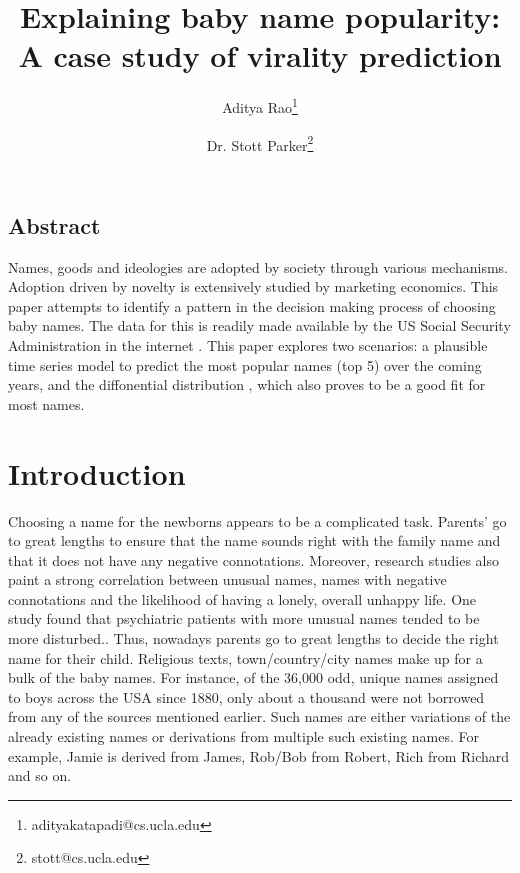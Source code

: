 \documentclass[letterpaper,10pt]{article}
\begin{document}
\date{}

\title{\Large \bf Explaining baby name popularity: A case study of virality prediction}

\author[1]{Aditya Rao\thanks{adityakatapadi@cs.ucla.edu}}
\author[2]{Dr. Stott Parker\thanks{stott@cs.ucla.edu}}
\maketitle

\thispagestyle{empty}


\subsection*{Abstract}
Names, goods and ideologies are adopted by society through various mechanisms. Adoption driven by novelty is extensively studied by marketing economics\cite{marketing paper}. This paper attempts to identify a pattern in the decision making process of choosing baby names. The data for this is readily made available by the US Social Security Administration in the internet \cite{voyagersite}. This paper explores two scenarios: a plausible time series model to predict the most popular names (top 5) over the coming years, and the diffonential distribution \cite{preston}, which also proves to be a good fit for most names.

\section{Introduction}
Choosing a name for the newborns appears to be a complicated task. Parents' go to great lengths to ensure that the name sounds right with the family name and that it does not have any negative connotations. Moreover, research studies also paint a strong correlation between unusual names, names with negative connotations and the likelihood of having a lonely, overall unhappy life. One study found that psychiatric patients with more unusual names tended to be more disturbed.\cite{http://www.bbc.com/news/magazine-26634477}. Thus, nowadays parents go to great lengths to decide the right name for their child.
Religious texts, town/country/city names make up for a bulk of the baby names. For instance, of the 36,000 odd, unique names assigned to boys across the USA since 1880, only about a thousand were not borrowed from any of the sources mentioned earlier. Such names are either variations of the already existing names or derivations from multiple such existing names. For example, Jamie is derived from James, Rob/Bob from Robert, Rich from Richard and so on. 
\end{document}
